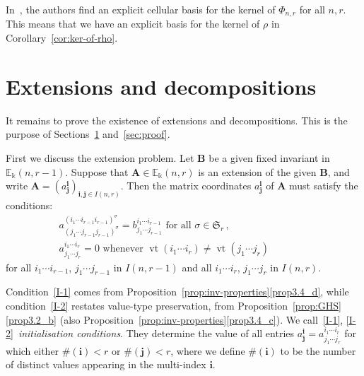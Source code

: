 \documentclass[10pt]{article}
\theoremstyle{definition}
\DeclareMathOperator{\vt}{vt}
\newcommand{\E}{\mathbb{E}}
\newcommand{\Sym}{\mathfrak{S}}
\newcommand{\bi}{{\boldsymbol{i}}} %
\newcommand{\bj}{{\boldsymbol{j}}}
\newcommand{\bA}{\mathbf{A}}
\newcommand{\bB}{\mathbf{B}}
\begin{document}
In~\cite{BDM:second}, the authors find an explicit cellular basis for
the kernel of $\Phi_{n,r}$ for all $n,r$. This means that we have an
explicit basis for the kernel of $\rho$ in Corollary~\ref{cor:ker-of-rho}. 



\section{Extensions and decompositions}\label{sec:extensions}%
It remains to prove the existence of extensions and
decompositions. This is the purpose of Sections~\ref{sec:extensions}
and~\ref{sec:proof}. 

First we discuss the extension problem. Let $\bB$ be a given fixed
invariant in $\E_\Bbbk(n,r-1)$. Suppose that $\bA \in \E_\Bbbk(n,r)$
is an extension of the given $\bB$, and write $\bA =
(a^\bi_\bj)_{\bi,\bj \in I(n,r)}$. Then the matrix coordinates
$a^\bi_\bj$ of $\bA$ must satisfy the conditions:
\begin{align}
 & a^{(i_1\cdots i_{r-1} i_{r-1})^\sigma}_{(j_1\cdots j_{r-1}
 j_{r-1})^\sigma} = b^{i_1\cdots i_{r-1}}_{j_1\cdots j_{r-1}} \text{ for
 all } \sigma \in \Sym_r \, , \tag{I-1} \label{I-1}\\
 & a^{i_1\cdots i_r}_{j_1\cdots j_r} = 0 \text{ whenever }
 \vt(i_1\cdots i_r) \ne \vt(j_1 \cdots j_r) \hspace{2cm}\tag{I-2}\label{I-2}
\end{align}
for all $i_1\cdots i_{r-1}$, $j_1\cdots j_{r-1}$ in $I(n,r-1)$ and all
$i_1\cdots i_r$, $j_1\cdots j_r$ in $I(n,r)$.

Condition~\eqref{I-1} comes from Proposition~\ref{prop:inv-properties}\ref{prop3.4_d},
while condition~\eqref{I-2} restates value-type preservation, from
Proposition~\ref{prop:GHS}\ref{prop3.2_b} (also Proposition~\ref{prop:inv-properties}\ref{prop3.4_c}). We call~\eqref{I-1}, \eqref{I-2}~\emph{initialisation conditions}. They determine the value of all
entries $a^\bi_\bj = a^{i_1 \cdots i_r}_{j_1\cdots j_r}$ for which
either $\#(\bi)<r$ or $\#(\bj)<r$, where we define $\#(\bi)$ to be the
number of distinct values appearing in the multi-index $\bi$. 
\end{document}
